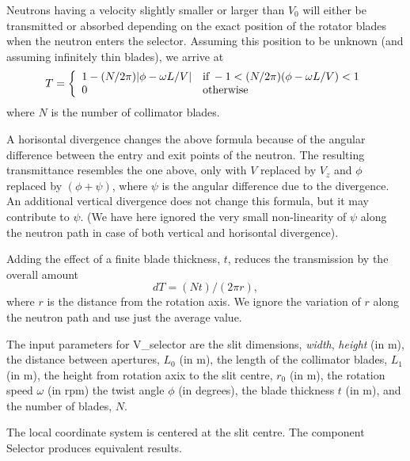 Neutrons having a velocity slightly smaller or larger than $V_0$
will either be transmitted or absorbed depending on the exact position
of the rotator blades when the neutron enters the selector.
Assuming this position to be unknown (and assuming infinitely
thin blades), we arrive at
\begin{equation}
T = \left\{
 \begin{array}{ll}
 1 - (N/2\pi ) |\phi-\omega L / V| &
        {\rm if}\,  -1 < (N/2\pi )(\phi -\omega L / V) < 1 \\
    0  &  {\rm otherwise}
 \end{array} \right.
\end{equation}
where $N$ is the number of collimator blades.

A horisontal divergence changes the above formula because of the
angular difference between the entry and exit points of the neutron.
The resulting transmittance resembles the one above, only with
$V$ replaced by $V_z$ and $\phi$ replaced by $(\phi +\psi )$,
where $\psi$ is the angular difference due to
the divergence. An additional vertical divergence does not change
this formula, but it may contribute to $\psi$.
(We have here ignored the very small non-linearity of $\psi$ along the
neutron path in case of both vertical and horisontal divergence).

Adding the effect of a finite blade thickness, $t$, reduces the transmission
by the overall amount
\begin{equation}
dT = (N t) / (2\pi r ) ,
\end{equation}
where $r$ is the distance from the rotation axis. We ignore the variation
of $r$ along the neutron path and use just the average value.

The input parameters for V\_selector are the slit dimensions,
\textit{width}, \textit{height} (in m),
the distance between apertures, $L_0$ (in m), the length of the
collimator blades, $L_1$ (in m), the height from rotation axix to the slit
centre, $r_0$ (in m), the rotation speed $\omega$ (in rpm)
the twist angle $\phi$ (in degrees), the blade thickness $t$ (in m),
and the number of blades, $N$.

The local coordinate system is centered at the slit centre.
The component Selector produces equivalent results.

